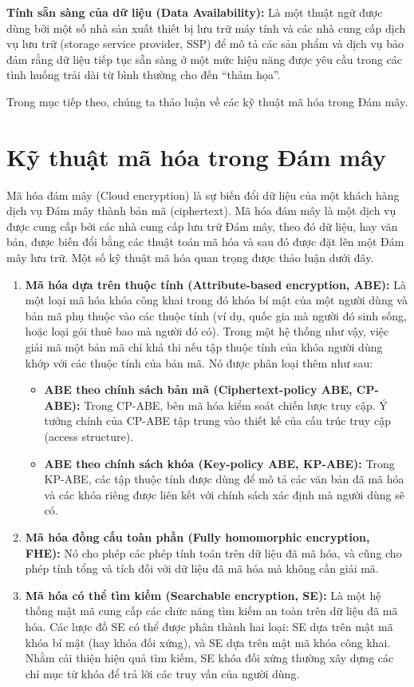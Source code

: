 \textbf{Tính sẵn sàng của dữ liệu (Data Availability):} Là một thuật ngữ được dùng bởi một số nhà sản xuất thiết bị lưu trữ máy tính và các nhà cung cấp dịch vụ lưu trữ (storage service provider, SSP) để mô tả các sản phẩm và dịch vụ bảo đảm rằng dữ liệu tiếp tục sẵn sàng ở một mức hiệu năng được yêu cầu trong các tình huống trải dài từ bình thường cho đến ``thảm họa''.

Trong mục tiếp theo, chúng ta thảo luận về các kỹ thuật mã hóa trong Đám mây.

\section{Kỹ thuật mã hóa trong Đám mây}

Mã hóa đám mây (Cloud encryption) là sự biến đổi dữ liệu của một khách hàng dịch vụ Đám mây thành bản mã (ciphertext). Mã hóa đám mây là một dịch vụ được cung cấp bởi các nhà cung cấp lưu trữ Đám mây, theo đó dữ liệu, hay văn bản, được biến đổi bằng các thuật toán mã hóa và sau đó được đặt lên một Đám mây lưu trữ. Một số kỹ thuật mã hóa quan trọng được thảo luận dưới đây.

\begin{enumerate}
  \item \textbf{Mã hóa dựa trên thuộc tính (Attribute-based encryption, ABE):} Là một loại mã hóa khóa công khai trong đó khóa bí mật của một người dùng và bản mã phụ thuộc vào các thuộc tính (ví dụ, quốc gia mà người đó sinh sống, hoặc loại gói thuê bao mà người đó có). Trong một hệ thống như vậy, việc giải mã một bản mã chỉ khả thi nếu tập thuộc tính của khóa người dùng khớp với các thuộc tính của bản mã. Nó được phân loại thêm như sau:

  \begin{itemize}
    \item \textbf{ABE theo chính sách bản mã (Ciphertext-policy ABE, CP-ABE):} Trong CP-ABE, bên mã hóa kiểm soát chiến lược truy cập. Ý tưởng chính của CP-ABE tập trung vào thiết kế của cấu trúc truy cập (access structure).

    \item \textbf{ABE theo chính sách khóa (Key-policy ABE, KP-ABE):} Trong KP-ABE, các tập thuộc tính được dùng để mô tả các văn bản đã mã hóa và các khóa riêng được liên kết với chính sách xác định mà người dùng sẽ có.
  \end{itemize}

  \item \textbf{Mã hóa đồng cấu toàn phần (Fully homomorphic encryption, FHE):} Nó cho phép các phép tính toán trên dữ liệu đã mã hóa, và cũng cho phép tính tổng và tích đối với dữ liệu đã mã hóa mà không cần giải mã.

  \item \textbf{Mã hóa có thể tìm kiếm (Searchable encryption, SE):} Là một hệ thống mật mã cung cấp các chức năng tìm kiếm an toàn trên dữ liệu đã mã hóa. Các lược đồ SE có thể được phân thành hai loại: SE dựa trên mật mã khóa bí mật (hay khóa đối xứng), và SE dựa trên mật mã khóa công khai. Nhằm cải thiện hiệu quả tìm kiếm, SE khóa đối xứng thường xây dựng các chỉ mục từ khóa để trả lời các truy vấn của người dùng.
\end{enumerate}

